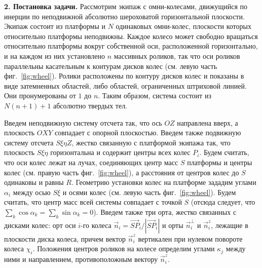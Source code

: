 {\bf 2. Постановка задачи.}
Рассмотрим экипаж с омни-колесами, движущийся по инерции по неподвижной абсолютно шероховатой горизонтальной плоскости. Экипаж состоит из платформы и $N$ одинаковых омни-колес, плоскости которых относительно платформы неподвижны. Каждое колесо может свободно вращаться относительно платформы вокруг собственной оси, расположенной горизонтально, и на каждом из них установлено $n$ массивных роликов, так что оси роликов параллельны 
касательным к контурам дисков колес (см. левую часть фиг.~\ref{fig:wheel}). Ролики расположены по контуру дисков колес и показаны в виде затемненных областей, либо областей, ограниченных штриховой линией. Они пронумерованы от $1$ до $n$.
Таким образом, система состоит из $N(n+1) + 1$ абсолютно твердых тел. 



Введем неподвижную систему отсчета так, что ось $OZ$ направлена вверх, а плоскость $OXY$ совпадает с опорной плоскостью.
Введем также подвижную систему отсчета $S\xi\eta Z$, жестко связанную с платформой экипажа так, что плоскость $S\xi\eta$ 
горизонтальна и содержит центры всех колес $P_i$. Будем считать, 
что оси колес лежат на лучах, соединяющих центр масс $S$ платформы и центры колес (см. правую часть фиг.~\ref{fig:wheel}), а расстояния от 
центров колес до $S$ одинаковы и равны $R$. Геометрию установки колес на платформе зададим углами $\alpha_i$ между осью $S\xi$ и осями колес 
(см. левую часть фиг.~\ref{fig:wheel}). Будем считать, что центр масс всей системы совпадает с точкой $S$ (отсюда следует, что $\sum\limits_{k} \cos\alpha_k = \sum\limits_{k}\sin\alpha_k = 0$). Введем также три орта, жестко связанных с дисками колес: орт оси $i$-го колеса $\vec{n}_i = \vec{SP}_i/|\vec{SP}_i|$ и орты $\vec{n}_i^\perp$ и $\vec{n}_i^z$, лежащие в плоскости диска колеса, причем вектор $\vec{n}_i^z$ вертикален при нулевом повороте колеса $\chi_i$. Положения центров роликов на колесе определим углами $\kappa_j$ между ними и направлением, противоположным вектору $\vec{n}_i^z$. 

